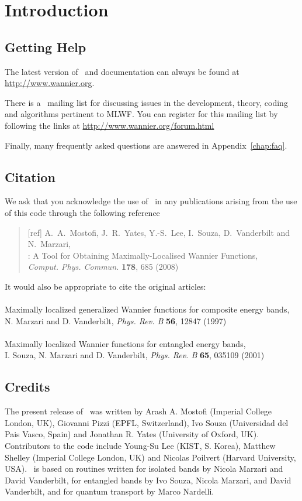 \chapter*{Introduction}
\section*{Getting Help}
The latest version of \wannier\ and documentation can always
be found at \url{http://www.wannier.org}.

There is a \wannier\ mailing list for discussing issues in the
development, theory, coding and algorithms pertinent to MLWF.
You can register for this mailing list by following the links at
\url{http://www.wannier.org/forum.html}

Finally, many frequently asked questions are answered in
Appendix~\ref{chap:faq}. 

\section*{Citation}
We ask that you acknowledge the use of \wannier\ in any publications
arising from the use of this code through the following reference
\begin{quote}
[ref] A.~A.~Mostofi, J.~R.~Yates, Y.-S.~Lee, I.~Souza, D.~Vanderbilt
and N.~Marzari,\\
\wannier: A Tool for Obtaining Maximally-Localised Wannier
  Functions,\\ {\it Comput. Phys. Commun.} {\bf 178}, 685 (2008)

\end{quote}                                                              

It would also be appropriate to cite the original articles:\\\\
Maximally localized generalized Wannier functions for composite
  energy bands,\\ 
N. Marzari and D. Vanderbilt, {\it Phys. Rev. B} {\bf 56}, 12847 (1997)\\\\
Maximally localized Wannier functions for entangled energy bands,\\
I. Souza, N. Marzari and D. Vanderbilt, {\it Phys. Rev. B} {\bf 65}, 035109 (2001)


\section*{Credits}
The present release of \wannier\ was written by Arash A. Mostofi
(Imperial College London, UK), Giovanni Pizzi (EPFL, Switzerland), Ivo Souza 
(Universidad del Pais Vasco, Spain) and
Jonathan R. Yates (University of
Oxford, UK). Contributors to the code include
Young-Su Lee (KIST, S. Korea), 
Matthew Shelley (Imperial College London, UK)
and Nicolas Poilvert (Harvard University, USA).
 \wannier\ is
based on routines written for isolated bands by Nicola Marzari
and David Vanderbilt, for entangled bands by Ivo Souza, Nicola Marzari,
and David Vanderbilt, and for quantum transport by Marco Nardelli.

